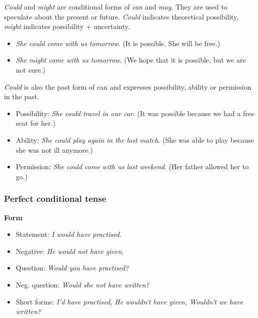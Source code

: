 \textit{Could} and \textit{might} are conditional forms of \textit{can} and \textit{may}. They are used to speculate about the present or future. \textit{Could} indicates theoretical possibility, \textit{might} indicates possibility + uncertainty. 

\begin{itemize}

\item \textit{She could come with us tomorrow}. (It is possible. She will be free.) 
\item \textit{She might come with us tomorrow}. (We hope that it is possible, but we are not sure.)
\end{itemize}

\textit{Could} is also the past form of can and expresses possibility, ability or permission in the past.

\begin{itemize}

\item Possibility: \textit{She could travel in our car}. (It was possible because we had a free seat for her.)
\item Ability: \textit{She could play again in the last match}. (She was able to play because she was not ill anymore.)
\item Permission: \textit{She could come with us last weekend}. (Her father allowed her to go.)

\end{itemize}

\subsubsection{Perfect conditional tense}

\textbf{Form}

\begin{itemize}

\item Statement: \textit{I would have practised}.
\item Negative: \textit{He would not have given}.
\item Question: \textit{Would you have practised?}
\item Neg. question: \textit{Would she not have written?}
\item Short forms: \textit{I'd have practised, He wouldn't have given, Wouldn't we have written?}

\end{itemize}

